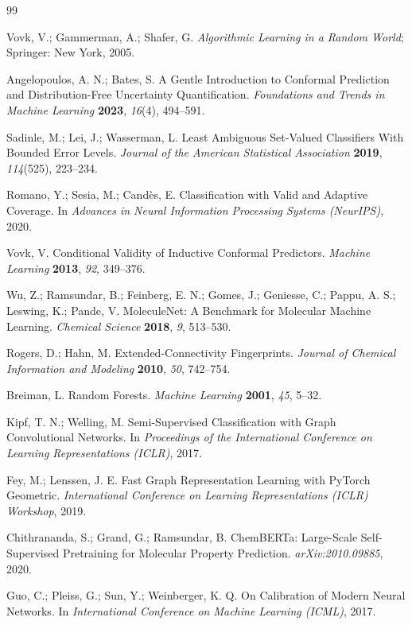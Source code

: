 \documentclass[11pt]{article}
\begin{document}
\begin{thebibliography}{99}

 Vovk, V.; Gammerman, A.; Shafer, G. \emph{Algorithmic Learning in a Random
World}; Springer: New York, 2005.

 Angelopoulos, A. N.; Bates, S. A Gentle Introduction to Conformal
Prediction and Distribution-Free Uncertainty Quantification. \emph{Foundations and Trends in
Machine Learning} \textbf{2023}, \emph{16}(4), 494--591.

 Sadinle, M.; Lei, J.; Wasserman, L. Least Ambiguous Set-Valued Classifiers
With Bounded Error Levels. \emph{Journal of the American Statistical Association} \textbf{2019},
\emph{114}(525), 223--234.

 Romano, Y.; Sesia, M.; Cand\`es, E. Classification with Valid and Adaptive
Coverage. In \emph{Advances in Neural Information Processing Systems (NeurIPS)}, 2020.

 Vovk, V. Conditional Validity of Inductive Conformal Predictors. \emph{Machine
Learning} \textbf{2013}, \emph{92}, 349--376.

 Wu, Z.; Ramsundar, B.; Feinberg, E. N.; Gomes, J.; Geniesse, C.; Pappu, A. S.;
Leswing, K.; Pande, V. MoleculeNet: A Benchmark for Molecular Machine Learning. \emph{Chemical
Science} \textbf{2018}, \emph{9}, 513--530.

 Rogers, D.; Hahn, M. Extended-Connectivity Fingerprints. \emph{Journal of
Chemical Information and Modeling} \textbf{2010}, \emph{50}, 742--754.

 Breiman, L. Random Forests. \emph{Machine Learning} \textbf{2001}, \emph{45},
5--32.

 Kipf, T. N.; Welling, M. Semi-Supervised Classification with Graph Convolutional
Networks. In \emph{Proceedings of the International Conference on Learning Representations
(ICLR)}, 2017.

 Fey, M.; Lenssen, J. E. Fast Graph Representation Learning with PyTorch
Geometric. \emph{International Conference on Learning Representations (ICLR) Workshop}, 2019.

 Chithrananda, S.; Grand, G.; Ramsundar, B. ChemBERTa: Large-Scale
Self-Supervised Pretraining for Molecular Property Prediction. \emph{arXiv:2010.09885}, 2020.

 Guo, C.; Pleiss, G.; Sun, Y.; Weinberger, K. Q. On Calibration of Modern Neural
Networks. In \emph{International Conference on Machine Learning (ICML)}, 2017.


\end{thebibliography}
\end{document}
